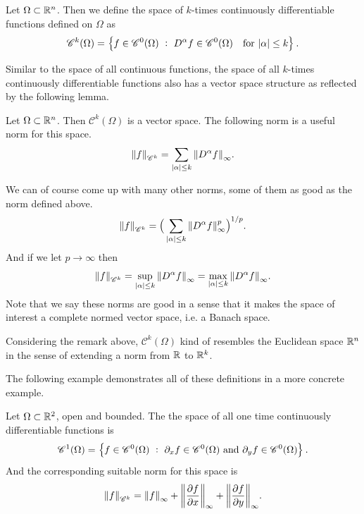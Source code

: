\begin{definition}
	Let $ \Omega \subset \mathbb{R}^n $. Then we define the space of $ k $-times continuously differentiable functions defined on $ \Omega $ as 
	\[ \mathscr{C}^k(\Omega) = \left\{ f \in \mathscr{C}^0(\Omega)\ :\ D^\alpha f \in \mathscr{C}^0(\Omega) \quad \text{for}\ |\alpha| \leq k    \right\}. \]
\end{definition}

Similar to the space of all continuous functions, the space of all $ k $-times continuously differentiable functions also has a vector space structure as reflected by the following lemma.

\begin{lemma}
	Let $ \Omega \subset \mathbb{R}^n $. Then $ \mathscr{C}^k(\Omega) $ is a vector space. The following norm is a useful norm for this space. 
	\[  \norm{f}_{\mathscr{C}^k} = \sum_{|\alpha| \leq k} \norm{D^\alpha f}_\infty. \]
\end{lemma}
\begin{remark}
	We can of course come up with many other norms, some of them as good as the norm defined above. 
	\[ \norm{f}_{\mathscr{C}^k} = \big(\sum_{|\alpha| \leq k} \norm{D^\alpha f}^p_\infty \big)^{1/p}. \]
	And if we let $ p \to \infty $ then 
	\[ \norm{f}_{\mathscr{C}^k} = \sup_{|\alpha|\leq k} \norm{D^\alpha f}_\infty = \max_{|\alpha|\leq k} \norm{D^\alpha f}_\infty. \]
	Note that we say these norms are good in a sense that it makes the space of interest a complete normed vector space, i.e. a Banach space. 
\end{remark}

\begin{observation}
	Considering the remark above, $ \mathscr{C}^k(\Omega) $ kind of resembles the Euclidean space $ \mathbb{R}^n $ in the sense of extending a norm from $ \mathbb{R} $ to $ \mathbb{R}^k $.
\end{observation}

The following example demonstrates all of these definitions in a more concrete example.

\begin{example}
	Let $ \Omega \subset \mathbb{R}^2 $, open and bounded. The the space of all one time continuously differentiable functions is
	\[ \mathscr{C}^1(\Omega) = \left\{ f\in \mathscr{C}^0(\Omega)\ :\ \partial_{x}f \in \mathscr{C}^0(\Omega)\ \text{and}\ \partial_y f \in \mathscr{C}^0(\Omega) \right\}. \]
	And the corresponding suitable norm for this space is
	\[ \norm{f}_{\mathscr{C}^k} = \norm{f}_\infty  + \norm{\frac{\partial f}{\partial x}}_\infty + \norm{\frac{\partial f}{\partial y}}_\infty. \]
\end{example}

